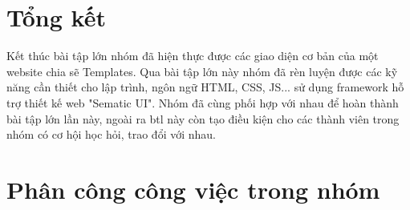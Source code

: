 \documentclass[a4paper]{article}
\begin{document}
\newpage
\section{Tổng kết}
Kết thúc bài tập lớn nhóm đã hiện thực được các giao diện cơ bản của một website chia sẽ Templates. Qua bài tập lớn này nhóm đã rèn luyện được các kỹ năng cần thiết cho lập trình, ngôn ngữ HTML, CSS, JS... sử dụng framework hỗ trợ thiết kế web "Sematic UI".
Nhóm đã  cùng phối hợp với nhau để hoàn thành bài tập lớn lần này, ngoài ra btl này còn tạo điều kiện cho các thành viên trong nhóm có cơ hội học hỏi, trao đổi với nhau. 



\newpage
\section{Phân công công việc trong nhóm}
\end{document}
